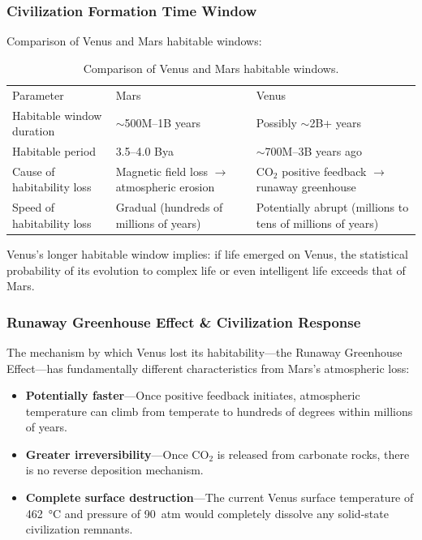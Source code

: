 \documentclass[aps,prd,twocolumn,superscriptaddress,nofootinbib]{revtex4-2}
\begin{document}
\subsubsection{Civilization Formation Time Window}\label{sec:venus-window}

Comparison of Venus and Mars habitable windows:

\begin{table}[htbp]
\caption{Comparison of Venus and Mars habitable windows.}
\label{tab:venus-mars}
\begin{ruledtabular}
\begin{tabular}{lll}
Parameter & Mars & Venus \\
\colrule
Habitable window duration & ${\sim}$500M--1B years & Possibly ${\sim}$2B+ years \\
Habitable period & 3.5--4.0 Bya & ${\sim}$700M--3B years ago \\
Cause of habitability loss & Magnetic field loss $\to$ atmospheric erosion & CO$_2$ positive feedback $\to$ runaway greenhouse \\
Speed of habitability loss & Gradual (hundreds of millions of years) & Potentially abrupt (millions to tens of millions of years) \\
\end{tabular}
\end{ruledtabular}
\end{table}

Venus's longer habitable window implies: if life emerged on Venus, the statistical probability of its evolution to complex life or even intelligent life exceeds that of Mars.

\subsubsection{Runaway Greenhouse Effect \& Civilization Response}\label{sec:venus-greenhouse}

The mechanism by which Venus lost its habitability---the Runaway Greenhouse Effect---has fundamentally different characteristics from Mars's atmospheric loss:

\begin{itemize}
  \item \textbf{Potentially faster}---Once positive feedback initiates, atmospheric temperature can climb from temperate to hundreds of degrees within millions of years.
  \item \textbf{Greater irreversibility}---Once CO$_2$ is released from carbonate rocks, there is no reverse deposition mechanism.
  \item \textbf{Complete surface destruction}---The current Venus surface temperature of \SI{462}{\degreeCelsius} and pressure of \SI{90}{atm} would completely dissolve any solid-state civilization remnants.
\end{itemize}
\end{document}
